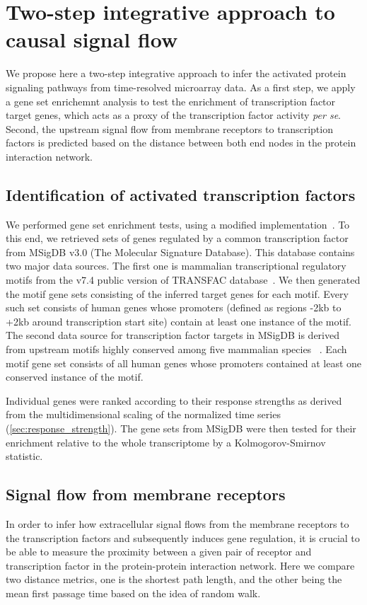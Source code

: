 \section{Two-step integrative approach to causal signal flow}
We propose here a two-step integrative approach to infer the activated protein signaling
pathways from time-resolved microarray data. As a first step, we apply a
gene set enrichemnt analysis to test the
enrichment of transcription factor target genes, which acts as a proxy of
the transcription factor activity \emph{per se}. Second, the upstream 
signal flow from membrane receptors to transcription factors is predicted 
based on the distance between both end nodes in the protein interaction
network.

\subsection{Identification of activated transcription factors}
We performed gene set enrichment tests, 
using a modified implementation~\citep{Luo2009}.
To this end, we retrieved sets of genes regulated by 
a common transcription factor from MSigDB v3.0 (The Molecular Signature Database). 
This database contains two major data sources. The first one is mammalian 
transcriptional regulatory motifs from the v7.4 public version of TRANSFAC 
database~\citep{Matys2003b}. We then generated the motif gene sets consisting 
of the inferred target genes for each motif. Every such set consists of human 
genes whose promoters (defined as regions -2kb to +2kb around transcription 
start site) contain at least one instance of the motif.
The second data source for transcription factor targets in MSigDB is derived 
from upstream motifs highly conserved among five mammalian species~%
\citep{Xie2005e}. Each motif gene set consists of all human genes whose 
promoters contained at least one conserved instance of the motif.

Individual genes were  ranked according to their response strengths as derived from the 
multidimensional scaling of the normalized time series 
(\ref{sec:response_strength}). 
The gene sets from MSigDB were  then tested for their enrichment 
 relative to the whole transcriptome by a Kolmogorov-Smirnov statistic. 

\subsection{Signal flow from membrane receptors}
In order to infer how extracellular signal flows from the membrane receptors to 
the transcription factors and subsequently induces gene regulation, it is 
crucial to be able to measure the proximity between a given pair of receptor and
transcription factor in the protein-protein interaction network. Here we 
compare two distance metrics, one is the shortest path length, and the other
being the mean first passage time based on the idea of random walk.

